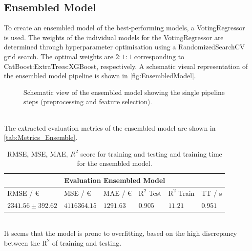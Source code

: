 \subsection{Ensembled Model}

To create an ensembled model of the best-performing models, a VotingRegressor is used. The weights of the individual models
for the VotingRegressor are determined through hyperparameter optimisation using a RandomizedSearchCV grid search. The optimal weights 
are $2:1:1$ corresponding to CatBoost:ExtraTrees:XGBoost, respectively.
A schematic visual representation of the ensembled model pipeline is shown in \autoref{fig:EnsembledModel}.
\begin{figure}
    \centering
        \caption{Schematic view of the ensembled model showing the single pipeline steps (preprocessing and feature selection).}
        \label{fig:EnsembledModel}
\end{figure}
\\ The extracted evaluation metrics of the ensembled model are shown in \autoref{tab:Metrics_Ensemble}.
\begin{table}[h!]
    \centering
      \begin{tabular}{ |p{3cm}||p{2cm}||p{2cm}|p{2cm}|p{2cm}|p{1.2cm} |}
        \hline
        \multicolumn{6}{|c|}{Evaluation Ensembled Model} \\
        \hline
        RMSE / €  & MSE / €  & MAE / € & $ \mathrm{R}^2 $ Test& $ \mathrm{R}^2 $ Train & TT / s \\
        \hline
        $2341.56 \pm  392.62$ & $4116364.15$ & $1291.63$ & $0.905$ & $11.21$ & $0.951$\\
        \hline
      \end{tabular}
      \caption{RMSE, MSE, MAE, $R^2$ score for training and testing and training time for the ensembled model.}
      \label{tab:Metrics_Ensemble}
  \end{table}
\\It seems that the model is prone to overfitting, based on the high discrepancy between the $ \mathrm{R}^2 $ of training and testing.
